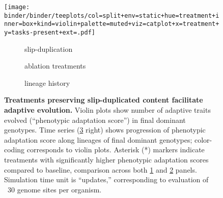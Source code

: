 \begin{figure}[!h]
  \centering
  \begin{adjustbox}{scale=0.8}
    \texttt{[image: binder/binder/teeplots/col=split+env=static+hue=treatment+inner=box+kind=violin+palette=muted+viz=catplot+x=treatment+y=tasks-present+ext=.pdf]}%
    \hspace*{-2.0cm}%
    \raisebox{0.125in}{%
      \texttt{[image: binder/binder/teeplots/env=static+errorbar=ci+hue=treatment+kind=line+palette=muted+viz=relplot+x=time-100k+y=tasks-present+ext=.pdf]}}%
  \end{adjustbox}

  \vspace{-7ex}

  \begin{subfigure}{0.3\textwidth}
    \caption{\small slip-duplication}
    \label{fig:results_panels:slip_duplication}
  \end{subfigure}%
  \begin{subfigure}{0.35\textwidth}
    \caption{\small ablation treatments}
    \label{fig:results_panels:ablation}
  \end{subfigure}%
  \begin{subfigure}{0.22\textwidth}
    \caption{\small lineage history}
    \label{fig:results_panels:time_series}
  \end{subfigure}

  \vspace{1ex}

  \caption{\textbf{Treatments preserving slip-duplicated content facilitate adaptive evolution.}
    \small Violin plots show number of adaptive traits evolved (``phenotypic adaptation score'') in final dominant genotypes.
    Time series (\ref{fig:results_panels:time_series} right) shows progression of phenotypic adaptation score along lineages of final dominant genotypes; color-coding corresponds to violin plots.
    Asterisk (*) markers indicate treatments with significantly higher phenotypic adaptation scores compared to baseline, comparison across both \ref{fig:results_panels:slip_duplication} and \ref{fig:results_panels:ablation} panels.
    Simulation time unit is “updates,” corresponding to evaluation of ~30 genome sites per organism.}
  \label{fig:results_panels}
\end{figure}
